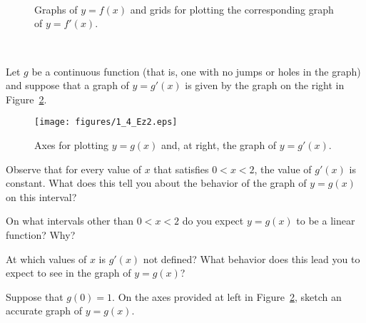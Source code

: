 \begin{exercises}
\begin{figure}[h]
  \begin{center}
 \\
\underline{\hspace{4in}}\\
\ \\
   \end{center}
   \caption{Graphs of $y = f(x)$ and grids for plotting the corresponding graph of $y = f'(x)$.} \label{F:1.4.Ez3a}
\end{figure}

\vfill \ 

\pagebreak


\item Let $g$ be a continuous function (that is, one with no jumps or holes in the graph) and suppose that a graph of $y= g'(x)$ is given by the graph  on the right in Figure~\ref{F:1.4.Ez2}.
\begin{figure}[h]
  \begin{center}
 \texttt{[image: figures/1\_4\_Ez2.eps]} %
   \end{center}
   \caption{Axes for plotting $y = g(x)$ and, at right, the graph of $y = g'(x)$.} \label{F:1.4.Ez2}
\end{figure}
\ba
	\item Observe that for every value of $x$ that satisfies $0 < x < 2$, the value of $g'(x)$ is constant.  What does this tell you about the behavior of the graph of $y = g(x)$ on this interval?
	\item On what intervals other than $0 < x < 2$ do you expect $y = g(x)$ to be a linear function?  Why?
	\item At which values of $x$ is $g'(x)$ not defined?  What behavior does this lead you to expect to see in the graph of $y=g(x)$?
	\item Suppose that $g(0) = 1$.  On the axes provided at left in  Figure~\ref{F:1.4.Ez2}, sketch an accurate graph of $y = g(x)$.
\ea





\end{exercises}
\afterexercises